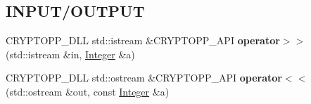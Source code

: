 \subsection*{INPUT/OUTPUT}
\label{_amgrp1b1587792b52046d87b6d77541dd2b4c}
 \begin{DoxyCompactItemize}
\item 
\hypertarget{class_integer_ad8150792213139b57d35119d2e0a0230}{
CRYPTOPP\_\-DLL std::istream \&CRYPTOPP\_\-API {\bfseries operator$>$$>$} (std::istream \&in, \hyperlink{class_integer}{Integer} \&a)}
\label{class_integer_ad8150792213139b57d35119d2e0a0230}

\item 
\hypertarget{class_integer_a2291fa412f3280385dd984bfb9311b91}{
CRYPTOPP\_\-DLL std::ostream \&CRYPTOPP\_\-API {\bfseries operator$<$$<$} (std::ostream \&out, const \hyperlink{class_integer}{Integer} \&a)}
\label{class_integer_a2291fa412f3280385dd984bfb9311b91}

\end{DoxyCompactItemize}
